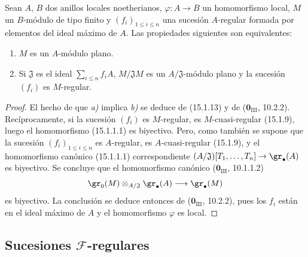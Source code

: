 \begin{proposition}[15.1.21]
\label{0.15.1.21-es}
Sean $A$, $B$ dos anillos locales noetherianos, $\varphi:A\to B$ un
homomorfismo local, $M$ un $B$-módulo de tipo finito y
$(f_i)_{1\leq i\leq n}$ una sucesión $A$-regular formada por elementos del
ideal máximo de $A$. Las propiedades siguientes son equivalentes:
\begin{enumerate}
  \item[\textup{a)}] $M$ es un $A$-módulo plano.
  \item[\textup{b)}] Si $\mathfrak{J}$ es el ideal $\sum_{i\leq n}f_iA$,
  $M/\mathfrak{J}M$ es un $A/\mathfrak{J}$-módulo plano y la sucesión $(f_i)$
  es $M$-regular.
\end{enumerate}
\end{proposition}

\begin{proof}
El hecho de que \emph{a)} implica \emph{b)} se deduce de (15.1.13) y de
($\mathbf{0}_{\mathrm{III}}$, 10.2.2). Recíprocamente, si la sucesión $(f_i)$ es
$M$-regular, es $M$-cuasi-regular (15.1.9), luego el homomorfismo
(15.1.1.1) es biyectivo. Pero, como también se supone que la sucesión
$(f_i)_{1\leq i\leq n}$ es $A$-regular, es $A$-cuasi-regular (15.1.9), y el
homomorfismo canónico (15.1.1.1) correspondiente
$(A/\mathfrak{J})[T_1,\ldots,T_n]\to\gr_\bullet(A)$ es biyectivo. Se concluye
que el homomorfismo canónico ($\mathbf{0}_{\mathrm{III}}$, 10.1.1.2)
\[
  \gr_0(M)\otimes_{A/\mathfrak{J}}\gr_\bullet(A)
  \longrightarrow\gr_\bullet(M)
\]
es biyectivo. La conclusión se deduce entonces de ($\mathbf 0_{\mathrm{III}}$,
10.2.2), pues los $f_i$ están en el ideal máximo de $A$ y el homomorfismo
$\varphi$ es local.
\end{proof}

\subsection{Sucesiones \texorpdfstring{$\mathscr{F}$}{F}-regulares}
\label{subsection:0.15.2-es}

